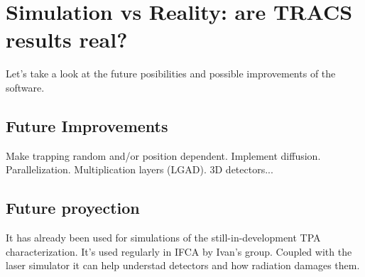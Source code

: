 \chapter{Simulation vs Reality: are TRACS results real?}

Let's take a look at the future posibilities and possible improvements of the software.

\section{Future Improvements} %
\label{sec:future_improvements}

Make trapping random and/or position dependent. Implement diffusion. Parallelization. Multiplication layers (LGAD). 3D detectors...


\section{Future proyection} %
\label{sec:future_proyection}

It has already been used for simulations of the still-in-development TPA characterization. It's used regularly in IFCA by Ivan's group. Coupled with the laser simulator it can help understad detectors and how radiation damages them.

